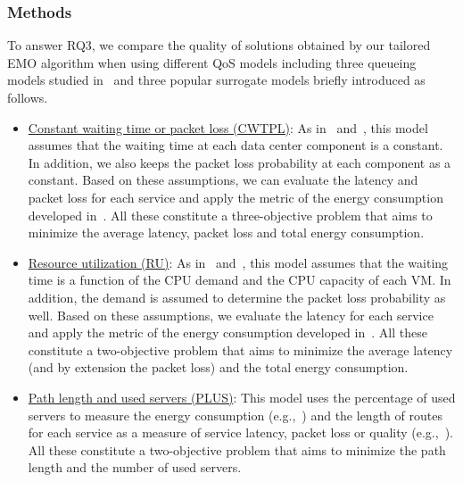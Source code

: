 \subsubsection{Methods}

To answer RQ3, we compare the quality of solutions obtained by our tailored EMO algorithm when using different QoS models including three queueing models studied in~ and three popular surrogate models briefly introduced as follows.
\begin{itemize}
    \item\underline{Constant waiting time or packet loss (CWTPL)}: As in~\cite{HawiloJS19} and~\cite{VizarretaCMMK17}, this model assumes that the waiting time at each data center component is a constant. In addition, we also keeps the packet loss probability at each component as a constant. Based on these assumptions, we can evaluate the latency and packet loss for each service and apply the metric of the energy consumption developed in~. All these constitute a three-objective problem that aims to minimize the average latency, packet loss and total energy consumption.

    \item\underline{Resource utilization (RU)}: As in~\cite{ChantreF20,QiSW19} and~\cite{GuoWLQA0Y20}, this model assumes that the waiting time is a function of the CPU demand and the CPU capacity of each VM. In addition, the demand is assumed to determine the packet loss probability as well. Based on these assumptions, we evaluate the latency for each service and apply the metric of the energy consumption developed in~. All these constitute a two-objective problem that aims to minimize the average latency (and by extension the packet loss) and the total energy consumption.

    \item\underline{Path length and used servers (PLUS)}: This model uses the percentage of used servers to measure the energy consumption (e.g.,~\cite{MiottoLCG19,RankothgeLRL17,LiuZDLGZ18}) and the length of routes for each service as a measure of service latency, packet loss or quality (e.g.,~\cite{LuizelliCBG17,AllegKMA17,BeckB15}). All these constitute a two-objective problem that aims to minimize the path length and the number of used servers.
\end{itemize}

